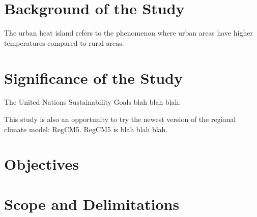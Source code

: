 \section{Background of the Study}
	The urban heat island refers to the phenomenon where urban areas have higher temperatures compared to rural areas.
	
\section{Significance of the Study}
	The United Nations Sustainability Goals blah blah blah.
	
	This study is also an opportunity to try the newest version of the regional climate model: RegCM5. RegCM5 is blah blah blah.

\section{Objectives}

\section{Scope and Delimitations}
	